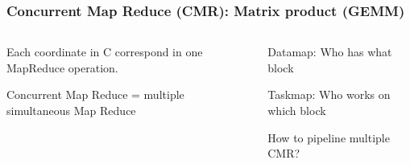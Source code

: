 \documentclass{beamer}
\begin{document}
\begin{frame}
    \frametitle{Concurrent Map Reduce (CMR): Matrix product (GEMM)}

    \begin{columns}[T]
        \begin{column}{0.5\textwidth}  %
            \begin{minipage}[t][.5\textheight]{\textwidth}
                \begin{center}
                    
                \end{center}
            \end{minipage}\par
            \begin{minipage}[t][.5\textheight]{\textwidth}
                Each coordinate in C correspond in one MapReduce operation.
                \newline

                Concurrent Map Reduce = multiple simultaneous Map Reduce
            \end{minipage}
        \end{column}
        \begin{column}{0.5\textwidth}
            \begin{minipage}[t][.5\textheight]{\textwidth}
                    Datamap: Who has what block
                    
                    Taskmap: Who works on which block
            \end{minipage}\par
            \begin{minipage}[t][.5\textheight]{\textwidth}
                How to pipeline multiple CMR?
            \end{minipage}
        \end{column}
    \end{columns}
\end{frame}
\end{document}

